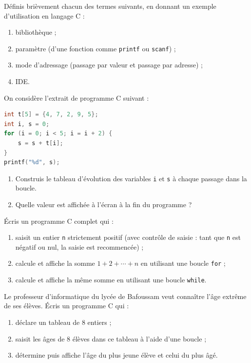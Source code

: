 \documentclass[11pt]{article}
\newcounter{popsec}
\newcounter{popsub}
\newcommand{\courssub}[1]{%
  \stepcounter{popsub}%
  \par\vspace{9pt}\noindent{\popxbold\fontsize{11.5}{13}\selectfont\color{popink}{\color{poporange}\thepopsec.\thepopsub}\hspace{6pt}#1}\par\nopagebreak\vspace{4pt}
}
\begin{document}
\begin{exercice}[Définitions]
Définis brièvement chacun des termes suivants, en donnant un exemple d'utilisation en langage C :
\begin{enumerate}
\item bibliothèque ;
\item paramètre (d'une fonction comme \texttt{printf} ou \texttt{scanf}) ;
\item mode d'adressage (passage par valeur et passage par adresse) ;
\item IDE.
\end{enumerate}
\end{exercice}

\begin{exercice}
On considère l'extrait de programme C suivant :
\begin{lstlisting}[language=C]
int t[5] = {4, 7, 2, 9, 5};
int i, s = 0;
for (i = 0; i < 5; i = i + 2) {
    s = s + t[i];
}
printf("%d", s);
\end{lstlisting}
\begin{enumerate}
\item Construis le tableau d'évolution des variables \texttt{i} et \texttt{s} à chaque passage dans la boucle.
\item Quelle valeur est affichée à l'écran à la fin du programme ?
\end{enumerate}
\end{exercice}

\courssub{Je m'entraîne}

\begin{exercice}
Écris un programme C complet qui :
\begin{enumerate}
\item saisit un entier \texttt{n} strictement positif (avec contrôle de saisie : tant que \texttt{n} est négatif ou nul, la saisie est recommencée) ;
\item calcule et affiche la somme $1 + 2 + \cdots + n$ en utilisant une boucle \texttt{for} ;
\item calcule et affiche la même somme en utilisant une boucle \texttt{while}.
\end{enumerate}
\end{exercice}

\begin{exercice}
Le professeur d'informatique du lycée de Bafoussam veut connaître l'âge extrême de ses élèves. Écris un programme C qui :
\begin{enumerate}
\item déclare un tableau de 8 entiers ;
\item saisit les âges de 8 élèves dans ce tableau à l'aide d'une boucle ;
\item détermine puis affiche l'âge du plus jeune élève et celui du plus âgé.
\end{enumerate}
\end{exercice}
\end{document}
